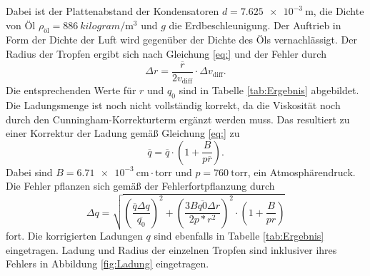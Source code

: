 Dabei ist der Plattenabstand der Kondensatoren $d=\qty{7.625e-3}{\meter}$, die Dichte von Öl 
$\rho_\text{öl}=\qty{886}{kilogram\per\meter\cubed}$ und $g$ die Erdbeschleunigung. Der Auftrieb in Form der Dichte der Luft
wird gegenüber der Dichte des Öls vernachlässigt.
Der Radius der Tropfen ergibt sich nach Gleichung \eqref{eq:} und der Fehler durch
\begin{equation}
    \Delta r=\frac{\overline{r}}{2v_\text{diff}}\cdot \Delta v_\text{diff}.
\end{equation}
Die entsprechenden Werte für $r$ und $q_0$ sind in Tabelle \ref{tab:Ergebnis} abgebildet.
Die Ladungsmenge ist noch nicht vollständig korrekt, da die Viskosität noch durch den Cunningham-Korrekturterm
ergänzt werden muss. Das resultiert zu einer Korrektur der Ladung gemäß Gleichung \eqref{eq:} zu
\begin{equation}
    \overline{q}=\overline{q}\cdot (1+\frac{B}{p\overline{r}}).
\end{equation}
Dabei sind $B=\qty{6.71e-3}{\centi\meter}\cdot\text{torr}$ und $p=\qty{760}{}\text{torr}$, ein Atmosphärendruck.
Die Fehler pflanzen sich gemäß der Fehlerfortpflanzung durch
\begin{equation}
    \Delta{q}=\sqrt{(\frac{\overline{q}\Delta q}{\overline{q_0}})^2+(\frac{3B\overline{q0}\Delta r}{2p*r^2})^2\cdot(1+\frac{B}{pr})}
\end{equation}
fort. Die korrigierten Ladungen $q$ sind ebenfalls in Tabelle \ref{tab:Ergebnis} eingetragen.
Ladung und Radius der einzelnen Tropfen sind inklusiver ihres Fehlers in Abbildung \ref{fig:Ladung} eingetragen.
